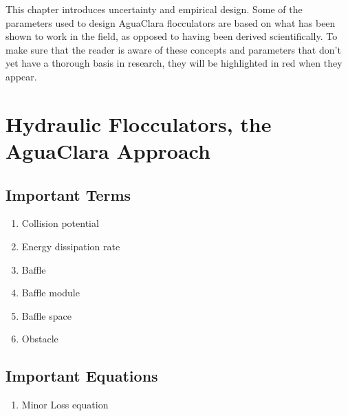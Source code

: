 \documentclass[letterpaper,10pt,english]{sphinxmanual}
\begin{document}
 This chapter introduces uncertainty and empirical design. Some of the parameters used to design AguaClara flocculators are based on what has been shown to work in the field, as opposed to having been derived scientifically. To make sure that the reader is aware of these concepts and parameters that don’t yet have a thorough basis in research, they will be highlighted in red when they appear.


\section{Hydraulic Flocculators, the AguaClara Approach}
\label{\detokenize{Flocculation/Floc_Design:hydraulic-flocculators-the-aguaclara-approach}}

\subsection{Important Terms}
\label{\detokenize{Flocculation/Floc_Design:important-terms}}\begin{enumerate}
\item {} 
Collision potential

\item {} 
Energy dissipation rate

\item {} 
Baffle

\item {} 
Baffle module

\item {} 
Baffle space

\item {} 
Obstacle

\end{enumerate}


\subsection{Important Equations}
\label{\detokenize{Flocculation/Floc_Design:important-equations}}\begin{enumerate}
\item {} 
Minor Loss equation

\end{enumerate}
\end{document}
